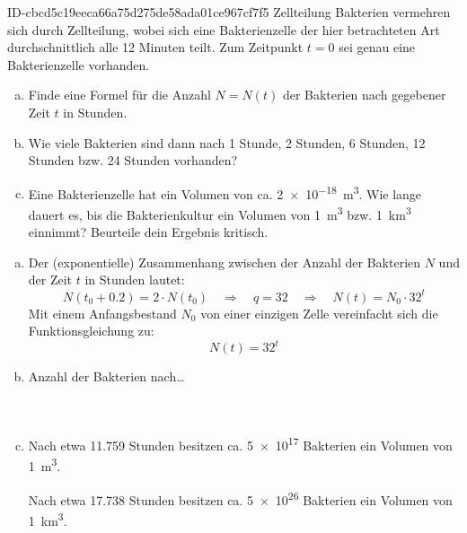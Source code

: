\begin{exercise}
      {ID-cbcd5c19eeca66a75d275de58ada01ce967cf7f5}
      {Zellteilung}
  \ifproblem\problem
    Bakterien vermehren sich durch Zellteilung, wobei sich eine
    Bakterienzelle der hier betrachteten Art durchschnittlich
    alle 12 Minuten teilt. Zum Zeitpunkt $t=0$ sei genau eine
    Bakterienzelle vorhanden.
    \begin{enumerate}[a)]
      \item Finde eine Formel für die Anzahl $N=N(t)$
            der Bakterien nach gegebener Zeit $t$ in Stunden.
      \item Wie viele Bakterien sind dann nach 1 Stunde, 2 Stunden,
            6 Stunden, 12 Stunden bzw. 24 Stunden vorhanden?
      \item Eine Bakterienzelle hat ein Volumen von ca.
            \SI{2e-18}{\cubic\metre}. Wie lange dauert es, bis die Bakterienkultur
            ein Volumen von \SI{1}{\cubic\metre} bzw. \SI{1}{\cubic\kilo\metre}
            einnimmt? Beurteile dein Ergebnis kritisch.
    \end{enumerate}
  \fi
  \ifoutcome\outcome
    \begin{enumerate}[a)]
      \item Der (exponentielle) Zusammenhang zwischen der Anzahl der
            Bakterien $N$ und der Zeit $t$ in Stunden lautet:
            \begin{equation*}
              N\left(t_{0}+\num{0.2}\right)=2\cdot N(t_{0})
              \quad\Rightarrow\quad
              q=\num{32}
              \quad\Rightarrow\quad
              N(t)=N_{0}\cdot\num{32}^{t}
            \end{equation*}
            Mit einem Anfangsbestand $N_{0}$ von einer einzigen Zelle
            vereinfacht sich die Funktionsgleichung zu:
            \begin{equation*}
              N(t)=\num{32}^{t}
            \end{equation*}
      \item Anzahl der Bakterien nach\ldots\\
            \\
            \\
      \item Nach etwa \num{11.759} Stunden besitzen ca. \num{5e+17} Bakterien
            ein Volumen von \SI{1}{\cubic\metre}.\par
            Nach etwa \num{17.738} Stunden besitzen ca. \num{5e+26} Bakterien
            ein Volumen von \SI{1}{\cubic\kilo\metre}.
    \end{enumerate}
  \fi
\end{exercise}
